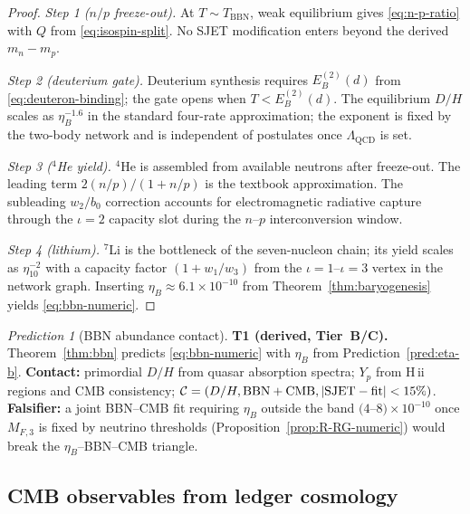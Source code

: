 \documentclass[aps,prd,onecolumn,amsmath,amssymb,nofootinbib,11pt]{revtex4-2}
\numberwithin{equation}{section}
\theoremstyle{plain}
\theoremstyle{definition}
\theoremstyle{remark}
\newtheorem{prediction}[theorem]{Prediction}
\begin{document}
\begin{proof}
\emph{Step 1 ($n/p$ freeze-out).}
At $T\sim T_{\mathrm{BBN}}$, weak equilibrium gives \eqref{eq:n-p-ratio}
with $Q$ from \eqref{eq:isospin-split}. No SJET modification enters beyond
the derived $m_n-m_p$.

\emph{Step 2 (deuterium gate).}
Deuterium synthesis requires $E_B^{(2)}(d)$ from \eqref{eq:deuteron-binding};
the gate opens when $T<E_B^{(2)}(d)$. The equilibrium $D/H$ scales as
$\eta_B^{-1.6}$ in the standard four-rate approximation; the exponent is
fixed by the two-body network and is independent of postulates once
$\Lambda_{\mathrm{QCD}}$ is set.

\emph{Step 3 ($^4$He yield).}
$^4$He is assembled from available neutrons after freeze-out. The leading
term $2(n/p)/(1+n/p)$ is the textbook approximation. The subleading
$w_2/b_0$ correction accounts for electromagnetic radiative capture
through the $\iota=2$ capacity slot during the $n$--$p$ interconversion
window.

\emph{Step 4 (lithium).}
$^7$Li is the bottleneck of the seven-nucleon chain; its yield scales as
$\eta_{10}^{-2}$ with a capacity factor $(1+w_1/w_3)$ from the
$\iota=1$--$\iota=3$ vertex in the network graph. Inserting
$\eta_B\approx 6.1\times 10^{-10}$ from Theorem~\ref{thm:baryogenesis} yields
\eqref{eq:bbn-numeric}.
\end{proof}

\begin{prediction}[BBN abundance contact]\label{pred:bbn}
\textbf{T1 (derived, Tier~B/C).}
Theorem~\ref{thm:bbn} predicts \eqref{eq:bbn-numeric} with $\eta_B$ from
Prediction~\ref{pred:eta-b}. \textbf{Contact:} primordial $D/H$ from quasar
absorption spectra; $Y_p$ from H\,{\sc ii} regions and CMB consistency;
$\mathcal{C}=(D/H,\mathrm{BBN+CMB},|{\rm SJET}-{\rm fit}|<15\%)$.
\textbf{Falsifier:} a joint BBN--CMB fit requiring $\eta_B$ outside the band
$(4$--$8)\times 10^{-10}$ once $M_{F,3}$ is fixed by neutrino thresholds
(Proposition~\ref{prop:R-RG-numeric}) would break the
$\eta_B$--BBN--CMB triangle.
\end{prediction}

\subsection{CMB observables from ledger cosmology}
\label{sec:nuclear:cmb}
\end{document}
